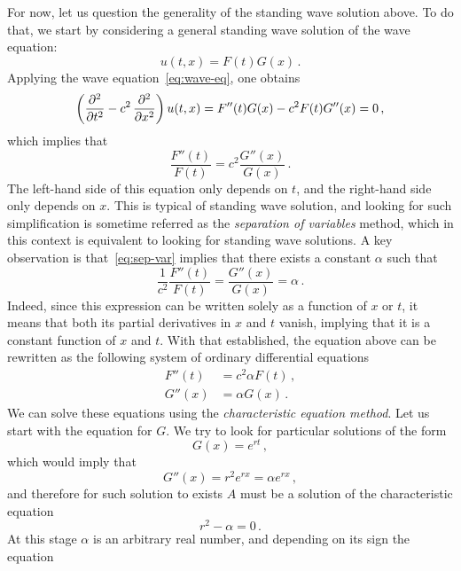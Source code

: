 For now, let us question the generality of the standing wave solution above. To do that, we start by considering a general standing wave solution of the wave equation:
\begin{equation}
  u(t,x)=F(t)G(x)\,.
\end{equation}
Applying the wave equation~\cref{eq:wave-eq}, one obtains
\begin{equation}
  \left(\frac{\partial^{2} }{\partial t^{2}}-c^2\,\frac{\partial^{2} }{\partial x^{2}}\right)u(t,x)=F''(t)G(x)-c^2F(t)G''(x)=0\,,
\end{equation}
which implies that
\begin{equation}
  \frac{F''(t)}{F(t)}=c^2\frac{G''(x)}{G(x)}\,.\label{eq:sep-var}
\end{equation}
The left-hand side of this equation only depends on $t$, and the right-hand side only depends on $x$. This is typical of standing wave solution, and looking for such simplification is sometime referred as the \emph{separation of variables} method, which in this context is equivalent to looking for standing wave solutions. A key observation is that~\cref{eq:sep-var} implies that there exists a constant $\alpha$ such that
\begin{equation}
  \frac{1}{c^2}\frac{F''(t)}{F(t)}=\frac{G''(x)}{G(x)}=\alpha\,.
\end{equation}
Indeed, since this expression can be written solely as a function of $x$ or $t$, it means that both its partial derivatives in $x$ and $t$ vanish, implying that it is a constant function of $x$ and $t$. With that established, the equation above can be rewritten as the following system of ordinary differential equations
\begin{align}
  F''(t)&=c^2\alpha F(t)\,,\label{eq:sep-var-F}\\
  G''(x)&=\alpha G(x)\,.
\end{align}
We can solve these equations using the \emph{characteristic equation method}. Let us start with the equation for $G$. We try to look for particular solutions of the form
\begin{equation}
  G(x)=e^{rt}\,,
\end{equation}
which would imply that
\begin{equation}
  G''(x)=r^2e^{rx}=\alpha e^{rx}\,,
\end{equation}
and therefore for such solution to exists $A$ must be a solution of the characteristic equation
\begin{equation}
  r^2-\alpha=0\,.
\end{equation}
At this stage $\alpha$ is an arbitrary real number, and depending on its sign the equation
